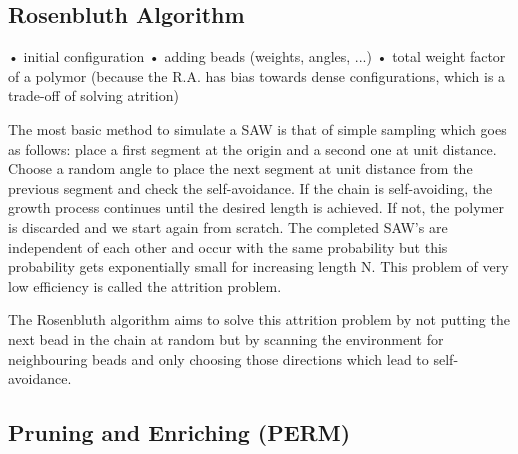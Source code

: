 \subsection*{Rosenbluth Algorithm}
		• initial configuration
		• adding beads (weights, angles, ...)
		• total weight factor of a polymor (because the R.A. has bias towards dense configurations, which is a trade-off of solving atrition)

The most basic method to simulate a SAW is that of simple sampling which goes as follows: place a first segment at the origin and a second one at unit distance. Choose a random angle to place the next segment at unit distance from the previous segment and check the self-avoidance. If the chain is self-avoiding, the growth process continues until the desired length is achieved. If not, the polymer is discarded and we start again from scratch. The completed SAW's are independent of each other and occur with the same probability but this probability gets exponentially small for increasing length N. This problem of very low efficiency is called the attrition problem.

The Rosenbluth algorithm aims to solve this attrition problem by not putting the next bead in the chain at random but by scanning the environment for neighbouring beads and only choosing those directions which lead to self-avoidance.


\subsection*{Pruning and Enriching (PERM)}
